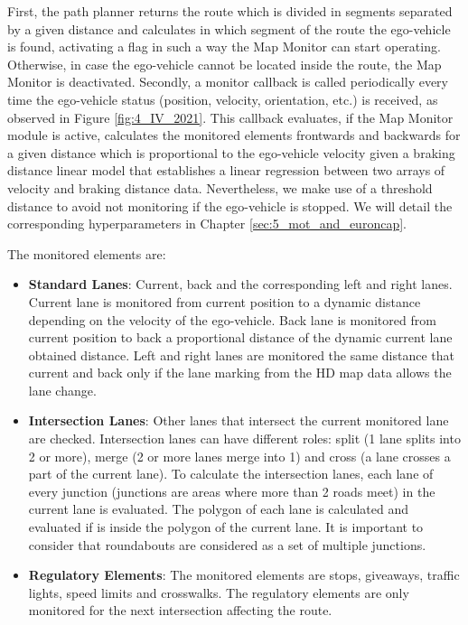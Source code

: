 First, the path planner returns the route which is divided in segments separated by a given distance and calculates in which segment of the route the ego-vehicle is found, activating a flag in such a way the Map Monitor can start operating. Otherwise, in case the ego-vehicle cannot be located inside the route, the Map Monitor is deactivated. Secondly, a monitor callback is called periodically every time the ego-vehicle status (position, velocity, orientation, etc.) is received, as observed in Figure \ref{fig:4_IV_2021}. This callback evaluates, if the Map Monitor module is active, calculates the monitored elements frontwards and backwards for a given distance which is proportional to the ego-vehicle velocity given a braking distance linear model that establishes a linear regression between two arrays of velocity and braking distance data. Nevertheless, we make use of a threshold distance to avoid not monitoring if the ego-vehicle is stopped. We will detail the corresponding hyperparameters in Chapter \ref{sec:5_mot_and_euroncap}.

The monitored elements are:

\begin{itemize}
	\item \textbf{Standard Lanes}: Current, back and the corresponding left and right lanes. Current lane is monitored from current position to a dynamic distance depending on the velocity of the ego-vehicle. Back lane is monitored from current position to back a proportional distance of the dynamic current lane obtained distance. Left and right lanes are monitored the same distance that current and back only if the lane marking from the HD map data allows the lane change.
	\item \textbf{Intersection Lanes}: Other lanes that intersect the current monitored lane are checked. Intersection lanes can have different roles: split (1 lane splits into 2 or more), merge (2 or more lanes merge into 1) and cross (a lane crosses a part of the current lane). To calculate the intersection lanes, each lane of every junction (junctions are areas where more than 2 roads meet) in the current lane is evaluated. The polygon of each lane is calculated and evaluated if is inside the polygon of the current lane. It is important to consider that roundabouts are considered as a set of multiple junctions. 
	\item \textbf{Regulatory Elements}: The monitored elements are stops, giveaways, traffic lights, speed limits and crosswalks. The regulatory elements are only monitored for the next intersection affecting the route. 
\end{itemize}

